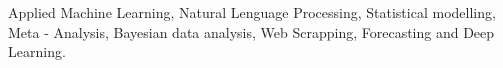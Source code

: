


\begin{cvparagraph}
Applied Machine Learning, Natural Lenguage Processing, Statistical modelling, Meta - Analysis, Bayesian data analysis, Web Scrapping, Forecasting and Deep Learning.

\end{cvparagraph}